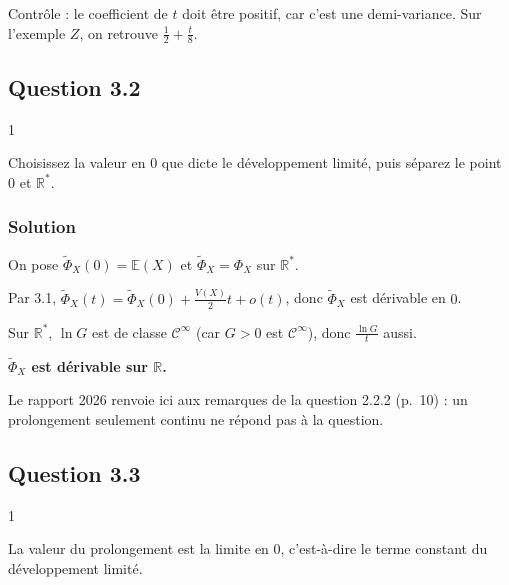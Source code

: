 \documentclass[11pt,a4paper]{article}
\begin{document}
\begin{methode}

Contrôle : le coefficient de \(t\) doit être positif, car c'est une demi-variance. Sur l'exemple \(Z\), on retrouve \(\frac12+\frac t8\).

\end{methode}

\hypertarget{question-3.2}{%
\subsection{Question 3.2}\label{question-3.2}}

\begin{indication}{1}

Choisissez la valeur en \(0\) que dicte le développement limité, puis séparez le point \(0\) et \(\mathbb R^*\).

\end{indication}

\hypertarget{solution-31}{%
\subsubsection{Solution}\label{solution-31}}

On pose \(\widetilde\Phi_X(0)=\mathbb E(X)\) et \(\widetilde\Phi_X=\Phi_X\) sur \(\mathbb R^*\).

Par 3.1, \(\widetilde\Phi_X(t)=\widetilde\Phi_X(0)+\frac{V(X)}2t+o(t)\), donc \(\widetilde\Phi_X\) est dérivable en \(0\).

Sur \(\mathbb R^*\), \(\ln G\) est de classe \(\mathcal C^\infty\) (car \(G>0\) est \(\mathcal C^\infty\)), donc \(\frac{\ln G}{t}\) aussi.

\textbf{\(\widetilde\Phi_X\) est dérivable sur \(\mathbb R\).}

\begin{jury}

Le rapport 2026 renvoie ici aux remarques de la question 2.2.2 (p.~10) : un prolongement seulement continu ne répond pas à la question.

\end{jury}

\hypertarget{question-3.3}{%
\subsection{Question 3.3}\label{question-3.3}}

\begin{indication}{1}

La valeur du prolongement est la limite en \(0\), c'est-à-dire le terme constant du développement limité.

\end{indication}
\end{document}
